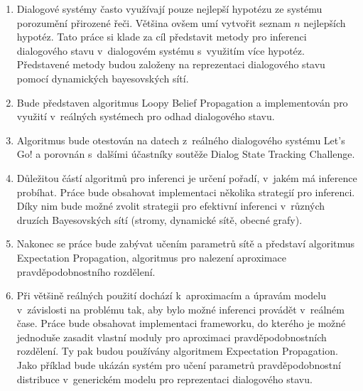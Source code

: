 \begin{enumerate}
\item Dialogové systémy často využívají pouze nejlepší hypotézu ze systému porozumění přirozené řeči.
    Většina ovšem umí vytvořit seznam $n$ nejlepších hypotéz.
    Tato práce si klade za cíl představit metody pro inferenci dialogového stavu v~dialogovém systému s~využitím více hypotéz.
    Představené metody budou založeny na reprezentaci dialogového stavu pomocí dynamických bayesovských sítí.
\item Bude představen algoritmus Loopy Belief Propagation a implementován pro využití v~reálných systémech pro odhad dialogového stavu.
\item Algoritmus bude otestován na datech z~reálného dialogového systému Let's Go! a porovnán s~dalšími účastníky soutěže Dialog State Tracking Challenge.
\item Důležitou částí algoritmů pro inferenci je určení pořadí, v~jakém má inference probíhat.
    Práce bude obsahovat implementaci několika strategií pro inferenci. Díky nim bude možné zvolit strategii pro efektivní inferenci v~různých druzích Bayesovských sítí (stromy, dynamické sítě, obecné grafy).
\item Nakonec se práce bude zabývat učením parametrů sítě a představí algoritmus Expectation Propagation, algoritmus pro nalezení aproximace pravděpodobnostního rozdělení.
\item Při většině reálných použití dochází k~aproximacím a úpravám modelu v~závislosti na problému tak, aby bylo možné inferenci provádět v~reálném čase.
Práce bude obsahovat implementaci frameworku, do kterého je možné jednoduše zasadit vlastní moduly pro aproximaci pravděpodobnostních rozdělení.
Ty pak budou používány algoritmem Expectation Propagation.
Jako příklad bude ukázán systém pro učení parametrů pravděpodobnostní distribuce v~generickém modelu pro reprezentaci dialogového stavu.
\end{enumerate}

